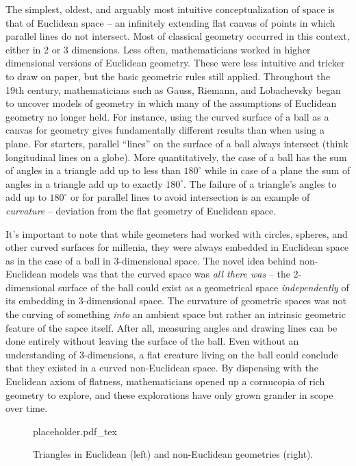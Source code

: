 The simplest, oldest, and arguably most intuitive conceptualization of space is that of Euclidean space -- an infinitely extending flat canvas of points in which parallel lines do not intersect. Most of classical geometry occurred in this context, either in $2$ or $3$ dimensions.
Less often, mathematicians worked in higher dimensional versions of Euclidean geometry. These were less intuitive and tricker to draw on paper, but the basic geometric rules still applied.
Throughout the 19th century, mathematicians such as Gauss, Riemann, and Lobachevsky began to uncover models of geometry in which many of the assumptions of Euclidean geometry no longer held.
For instance, using the curved surface of a ball as a canvas for geometry gives fundamentally different results than when using a plane. For starters, parallel ``lines'' on the surface of a ball always intersect (think longitudinal lines on a globe).
More quantitatively, the case of a ball has the sum of angles in a triangle add up to less than $180^\circ$ while in case of a plane the sum of angles in a triangle add up to exactly $180^\circ$. The failure of a triangle's angles to add up to $180^\circ$ or for parallel lines to avoid intersection is an example of \emph{curvature} -- deviation from the flat geometry of Euclidean space.

It's important to note that while geometers had worked with circles, spheres, and other curved surfaces for millenia, they were always embedded in Euclidean space as in the case of a ball in $3$-dimensional space. The novel idea behind non-Euclidean models was that the curved space was \emph{all there was} -- the $2$-dimensional surface of the ball could exist as a geometrical space \emph{independently} of its embedding in $3$-dimensional space.
The curvature of geometric spaces was not the curving of something \emph{into} an ambient space but rather an intrinsic geometric feature of the sapce itself. After all, measuring angles and drawing lines can be done entirely without leaving the surface of the ball. Even without an understanding of $3$-dimensions, a flat creature living on the ball could conclude that they existed in a curved non-Euclidean space.
By dispensing with the Euclidean axiom of flatness, mathematicians opened up a cornucopia of rich geometry to explore, and these explorations have only grown grander in scope over time.

\begin{figure}[ht]
	\centering
	{placeholder.pdf_tex}
	\caption{Triangles in Euclidean (left) and non-Euclidean geometries (right).}\label{fig:triangles}
\end{figure}

